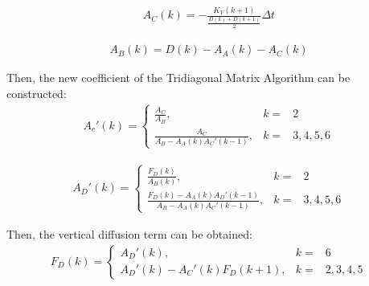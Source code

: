 \begin{eqnarray}
A_{C}(k)=-\frac{K_{V}(k+1)}{\frac{D(k)+D(k+1)}{2}}\Delta t
\end{eqnarray}

\begin{eqnarray}
A_{B}(k)=D(k)-A_{A}(k)-A_{C}(k)
\end{eqnarray}

Then, the new coefficient of the Tridiagonal Matrix Algorithm can be constructed: \begin{eqnarray}
A_{c}'(k)=\left\{\begin{matrix}
\frac{A_{C}}{A_{B}},&k=&2\\\frac{A_{C}}{A_{B}-A_{A}(k)A_{C}'(k-1)}, &k=&3, 4, 5, 6
\end{matrix}\right.
\end{eqnarray}

\begin{eqnarray}
A_{D}'(k)=\left\{\begin{matrix}
\frac{F_{D}(k)}{A_{B}(k)}, &k=&2\\\frac{F_{D}(k)-A_{A}(k)A_{D}'(k-1)}{A_{B}-A_{A}(k)A_{C}'(k-1)}, &k=&3, 4, 5, 6
\end{matrix}\right.
\end{eqnarray}

Then, the vertical diffusion term can be obtained: \begin{eqnarray}
F_{D}(k)=\left\{\begin{matrix}
A_{D}'(k), &k=&6\\A_{D}'(k)-A_{C}'(k)F_{D}(k+1), &k=&2, 3, 4, 5
\end{matrix}\right.
\end{eqnarray}

